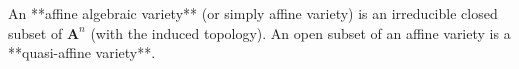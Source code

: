 An **affine algebraic variety** (or simply affine variety) is an irreducible closed subset of $\mathbf{A}^n$ (with the induced topology). An open subset of an affine variety is a **quasi-affine variety**.
